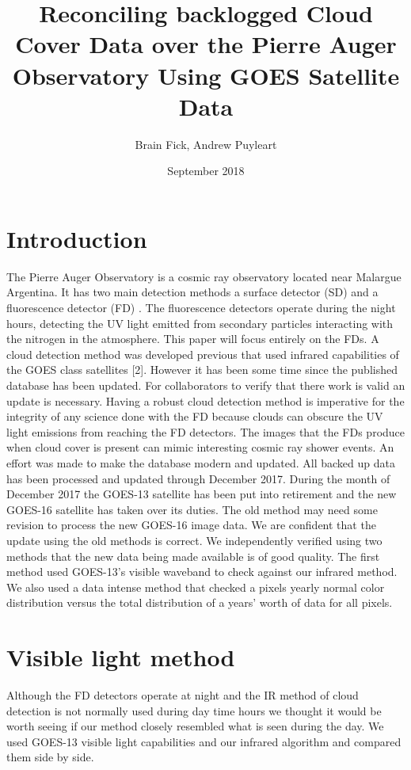 \documentclass{article}
\title{Reconciling backlogged Cloud Cover Data over the Pierre Auger Observatory
Using GOES Satellite Data}
\author{Brain Fick, Andrew Puyleart}
\date{September 2018}
\begin{document}
\maketitle

\section{Introduction}

The Pierre Auger Observatory is a cosmic ray observatory located near Malargue
Argentina. It has two main detection methods a surface detector (SD) and a
fluorescence detector (FD) \cite{P_Abreu}. The fluorescence detectors operate
during the night hours, detecting the UV light emitted from secondary particles
interacting with the nitrogen in the atmosphere. This paper will focus entirely
on the FDs. A cloud detection method was developed previous that used infrared
capabilities of the GOES class satellites [2]. However it has been some time
since the published database has been updated. For collaborators to verify that
there work is valid an update is necessary. Having a robust cloud detection
method is imperative for the integrity of any science done with the FD because
clouds can obscure the UV light emissions from reaching the FD detectors. The
images that the FDs produce when cloud cover is present can mimic interesting
cosmic ray shower events. An effort was made to make the database modern and
updated. All  backed up data has been processed and updated through December
2017. During the month of December 2017 the GOES-13 satellite has been put into
retirement and the new GOES-16 satellite has taken over its duties. The old
method may need some revision to process the new GOES-16 image data. We are
confident that the update using the old methods is correct. We independently
verified using two methods that the new data being made available is of good
quality. The first method used GOES-13’s visible waveband to check against our
infrared method. We also used a data intense method that checked a pixels
yearly normal color distribution versus the total distribution of a years’
worth of data for all pixels.  

\section{Visible light method}

Although the FD detectors operate at night and the IR method of cloud detection
is not normally used during day time hours we thought it would be worth seeing
if our method closely resembled what is seen during the day. We used GOES-13
visible light capabilities and our infrared algorithm and compared them side by
side. 
\end{document}
